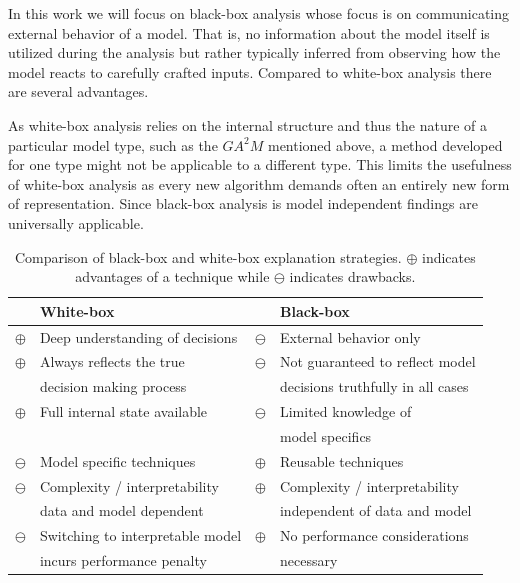 In this work we will focus on black-box analysis whose focus is on communicating external behavior of a model. That is, no information about the model itself is utilized during the analysis but rather typically inferred from observing how the model reacts to carefully crafted inputs. Compared to white-box analysis there are several advantages.

As white-box analysis relies on the internal structure and thus the nature of a particular model type, such as the $GA^2M$ mentioned above, a method developed for one type might not be applicable to a different type. This limits the usefulness of white-box analysis as every new algorithm demands often an entirely new form of representation. Since black-box analysis is model independent findings are universally applicable.

\newcommand\Tstrut{\rule{0pt}{2.5ex}}
\begin{table}
     \begin{tabular}{cl|cl} 
     & \textbf{White-box} & & \textbf{Black-box} \\
     \hline
     \hline
    $\oplus$ & Deep understanding of decisions & $\ominus$ & External behavior only \Tstrut \\
    $\oplus$ & Always reflects the true & $\ominus$ & Not guaranteed to reflect model \Tstrut \\
    & decision making process & & decisions truthfully in all cases \\
    $\oplus$ & Full internal state available & $\ominus$ & Limited knowledge of \Tstrut \\
    & & & model specifics \\
    \hline
    $\ominus$ & Model specific techniques & $\oplus$ & Reusable techniques \Tstrut \\
    $\ominus$ & Complexity / interpretability & $\oplus$ & Complexity / interpretability \Tstrut \\ 
    & data and model dependent & & independent of data and model \\
    $\ominus$ & Switching to interpretable model & $\oplus$ & No performance considerations \Tstrut \\
    & incurs performance penalty & & necessary \\
    \end{tabular}
    \centering
    \caption[Comparison of black-box and white-box explanation strategies.]{Comparison of black-box and white-box explanation strategies. $\oplus$ indicates advantages of a technique while $\ominus$ indicates drawbacks.}
    \label{tab:blackvswhite}
\end{table}

